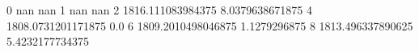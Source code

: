 0 nan nan
1 nan nan
2 1816.111083984375 8.0379638671875
4 1808.0731201171875 0.0
6 1809.2010498046875 1.1279296875
8 1813.496337890625 5.4232177734375
